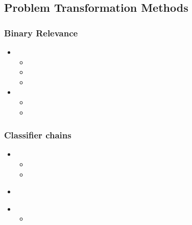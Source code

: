 \documentclass{beamer}
\begin{document}
\subsection{Problem Transformation Methods}

\begin{frame}
\frametitle{Binary Relevance}

\begin{itemize}
	\item <2-> 
	\begin{itemize}
		\item <3-> 
		\item <4-> 
		\item <5-> 
	\end{itemize}
	\item <6-> 
	\begin{itemize}
		\item <7-> 
		\item <8-> 
	\end{itemize}
\end{itemize}
\end{frame}

\begin{frame}
	\frametitle{Classifier chains}
	\begin{itemize}
		\item <2-> 
		\begin{itemize}
			\item 
			\item <4-> 
		\end{itemize}
	\end{itemize}
	\begin{itemize}
		\item<5-> 
	\end{itemize}
	
	\begin{itemize}
		\item <7-> 
		\begin{itemize}
			\item <8-> 
		\end{itemize}
	\end{itemize}
\end{frame}
\end{document}
